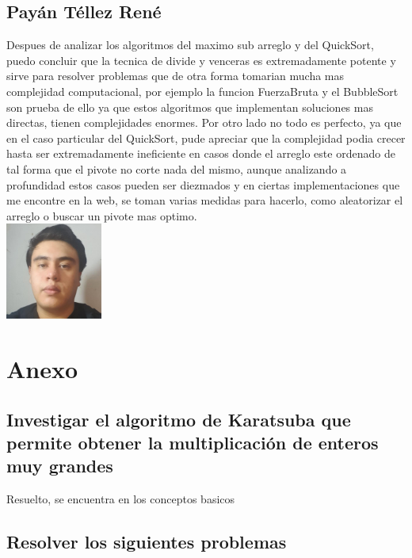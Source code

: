 \documentclass[spanish]{article}
\begin{document}
	\subsection{Payán Téllez René}
	Despues de analizar los algoritmos del maximo sub arreglo y del QuickSort, puedo concluir que la tecnica de divide y venceras es extremadamente potente y sirve para resolver problemas que de otra forma tomarian mucha mas complejidad computacional, por ejemplo la funcion FuerzaBruta y el BubbleSort son prueba de ello ya que estos algoritmos que implementan soluciones mas directas, tienen complejidades enormes. Por otro lado no todo es perfecto, ya que en el caso particular del QuickSort, pude apreciar que la complejidad podia crecer hasta ser extremadamente ineficiente en casos donde el arreglo este ordenado de tal forma que el pivote no corte nada del mismo, aunque analizando a profundidad estos casos pueden ser diezmados y en ciertas implementaciones que me encontre en la web, se toman varias medidas para hacerlo, como aleatorizar el arreglo o buscar un pivote mas optimo.\\
	\includegraphics[height=120px,width=120px]{Rene}
	\section{Anexo}			
	\subsection{Investigar el algoritmo de Karatsuba que permite obtener la multiplicación de enteros muy grandes}
	Resuelto, se encuentra en los conceptos basicos
	\subsection{Resolver los siguientes problemas}
\end{document}
